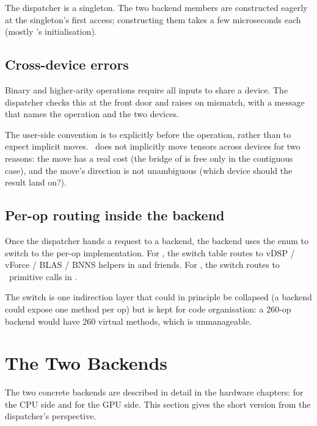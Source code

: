 The dispatcher is a singleton. The two backend members are
constructed eagerly at the singleton's first access; constructing
them takes a few microseconds each (mostly \MLX's initialisation).

\subsection{Cross-device errors}
\label{ssec:backend_dispatch:cross_device}

Binary and higher-arity operations require all inputs to share a
device. The dispatcher checks this at the front door and raises
 on mismatch, with a
message that names the operation and the two devices.

The user-side convention is to  explicitly before
the operation, rather than to expect implicit moves. \Lucid\ does
not implicitly move tensors across devices for two reasons: the
move has a real cost (the bridge of  is
free only in the contiguous case), and the move's direction is not
unambiguous (which device should the result land on?).

\subsection{Per-op routing inside the backend}
\label{ssec:backend_dispatch:per_op_internal}

Once the dispatcher hands a request to a backend, the backend uses
the  enum to switch to the per-op implementation. For
, the switch table routes to vDSP / vForce
/ BLAS / BNNS helpers in  and friends. For
, the switch routes to \MLX\ primitive calls in
.

The switch is one indirection layer that could in principle be
collapsed (a backend could expose one method per op) but is kept
for code organisation: a 260-op backend would have 260 virtual
methods, which is unmanageable.

\section{The Two Backends}
\label{sec:backend_dispatch:cpu_gpu}

The two concrete backends are described in detail in the hardware
chapters:  for the CPU side and
 for the GPU side. This section gives the
short version from the dispatcher's perspective.

